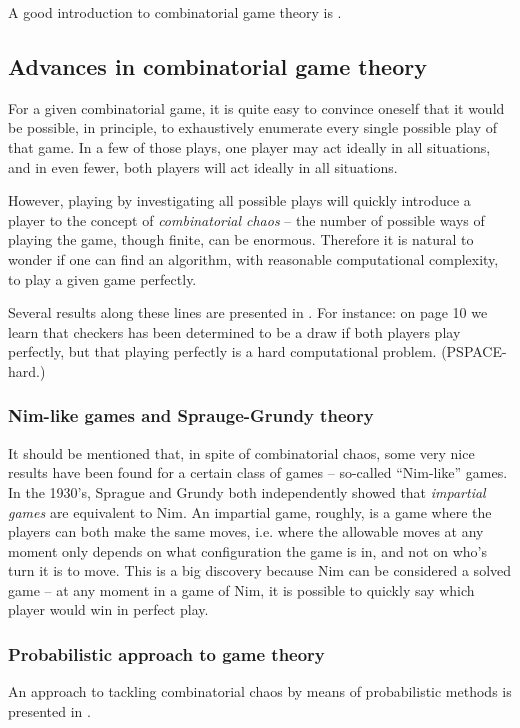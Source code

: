 A good introduction to combinatorial game theory is \citep{winning_ways}.

\subsection{Advances in combinatorial game theory}

For a given combinatorial game, it is quite easy to convince oneself that it would be possible, in principle, to exhaustively enumerate every single possible play of that game.
In a few of those plays, one player may act ideally in all situations, and in even fewer, both players will act ideally in all situations.

However, playing by investigating all possible plays will quickly introduce a player to the concept of \emph{combinatorial chaos} -- the number of possible ways of playing the game, though finite, can be enormous.
Therefore it is natural to wonder if one can find an algorithm, with reasonable computational complexity, to play a given game perfectly.

Several results along these lines are presented in \citep{demaine_hearn08}. For instance: on page 10 we learn that checkers has been determined to be a draw if both players play perfectly, but that playing perfectly is a hard computational problem. (PSPACE-hard.)

\subsubsection{Nim-like games and Sprauge-Grundy theory}

It should be mentioned that, in spite of combinatorial chaos, some very nice results have been found for a certain class of games -- so-called ``Nim-like'' games.
In the 1930's, Sprague and Grundy both independently showed that \emph{impartial games} are equivalent to Nim.
An impartial game, roughly, is a game where the players can both make the same moves, i.e. where the allowable moves at any moment only depends on what configuration the game is in, and not on who's turn it is to move.
This is a big discovery because Nim can be considered a solved game -- at any moment in a game of Nim, it is possible to quickly say which player would win in perfect play.

\subsubsection{Probabilistic approach to game theory}

An approach to tackling combinatorial chaos by means of probabilistic methods is presented in \citep{beck08}.

